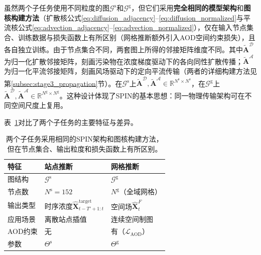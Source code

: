 虽然两个子任务使用不同粒度的图$\mathcal{G}^{\text{s}}$和$\mathcal{G}^{\text{g}}$，但它们采用\textbf{完全相同的模型架构}和\textbf{图核构建方法}（扩散核公式\eqref{eq:diffusion_adjacency}--\eqref{eq:diffusion_normalized}与平流核公式\eqref{eq:advection_adjacency}--\eqref{eq:advection_normalized}），仅在输入节点集合、训练数据与损失函数上有所区别（网格推断额外引入AOD空间约束损失），且各自独立训练。由于节点集合不同，两套图上所得的邻接矩阵维度不同。其中$\tilde{\mathbf{A}}^{\mathcal{D}}$为归一化扩散邻接矩阵，刻画污染物在浓度梯度驱动下的各向同性扩散传播；$\tilde{\mathbf{A}}^{\mathcal{A}}$为归一化平流邻接矩阵，刻画风场驱动下的定向平流传输（两者的详细构建方法见第\ref{subsec:stage3_propagation}节）。在$\mathcal{G}^{\text{s}}$上$\tilde{\mathbf{A}}^{\mathcal{D}}, \tilde{\mathbf{A}}^{\mathcal{A}} \in \mathbb{R}^{N^{\text{s}} \times N^{\text{s}}}$，在$\mathcal{G}^{\text{g}}$上$\tilde{\mathbf{A}}^{\mathcal{D}}, \tilde{\mathbf{A}}^{\mathcal{A}} \in \mathbb{R}^{N^{\text{g}} \times N^{\text{g}}}$。这种设计体现了SPIN的基本思想：同一物理传输架构可在不同空间尺度上复用。

表~\ref{tab:task_comparison}对比了两个子任务的主要特征与差异。

\begin{table}[htbp]
    \centering
    \caption{站点推断与网格推断任务对比}
    \caption*{两个子任务采用相同的SPIN架构和图核构建方法，但在节点集合、输出粒度和损失函数上有所区别。}
    \label{tab:task_comparison}
    \begin{tabular}{@{}lll@{}}
        \toprule
        特征 & 站点推断 & 网格推断 \\
        \midrule
        图结构 & $\mathcal{G}^{\text{s}}$ & $\mathcal{G}^{\text{g}}$ \\
        节点数 & $N^{\text{s}}=152$ & $N^{\text{g}}$（全域网格） \\
        输出类型 & 时序浓度$\hat{\mathbf{X}}^{\text{target}}_{t-T'+1:t}$ & 空间场$\hat{\mathbf{X}}^{F}_t$ \\
        应用场景 & 离散站点插值 & 连续空间制图 \\
        AOD约束 & 无 & 有（$\mathcal{L}_{\mathrm{AOD}}$） \\
        参数 & $\Theta^{\text{s}}$ & $\Theta^{\text{g}}$ \\
        \bottomrule
    \end{tabular}
\end{table}

